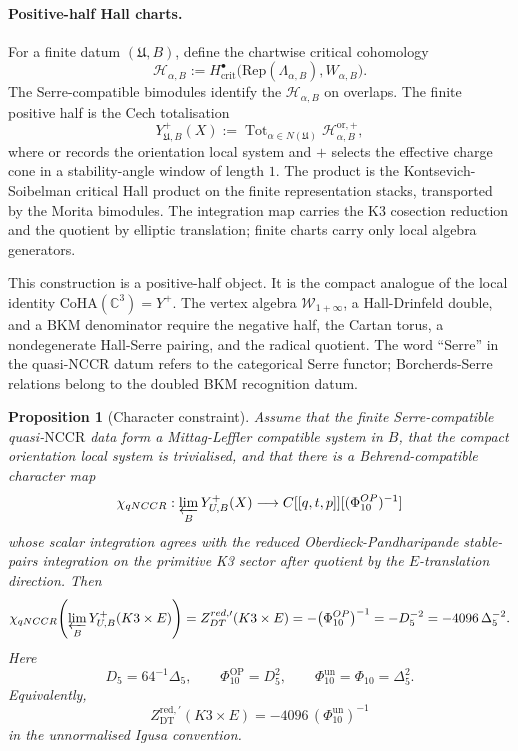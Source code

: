 \documentclass[11pt]{article}
\providecommand{\bC}{\mathbb{C}}
\providecommand{\CoHA}{\mathrm{CoHA}}
\providecommand{\DT}{\mathrm{DT}}
\providecommand{\Rep}{\mathrm{Rep}}
\providecommand{\Tot}{\operatorname{Tot}}
\providecommand{\red}{\mathrm{red}}
\providecommand{\bcrit}{\mathrm{crit}}
\providecommand{\NCCR}{\mathrm{NCCR}}
\providecommand{\Yplus}{Y^{+}}
\providecommand{\DeltaFive}{\Delta_{5}}
\providecommand{\Dfive}{D_{5}}
\providecommand{\PhiTen}{\Phi_{10}}
\providecommand{\PhiTenOP}{\Phi_{10}^{\mathrm{OP}}}
\providecommand{\PhiTenUn}{\Phi_{10}^{\mathrm{un}}}
\theoremstyle{plain}
\newtheorem{proposition}[theorem]{Proposition}
\theoremstyle{definition}
\begin{document}
\paragraph*{Positive-half Hall charts.}
For a finite datum \((\mathfrak U,B)\), define the chartwise critical
cohomology
\[
  \mathcal H_{\alpha,B}:=
  H^\bullet_{\bcrit}\bigl(\Rep(\Lambda_{\alpha,B}),W_{\alpha,B}\bigr).
\]
The Serre-compatible bimodules identify the \(\mathcal H_{\alpha,B}\)
on overlaps. The finite positive half is the Cech totalisation
\[
  \Yplus_{\mathfrak U,B}(X):=
  \Tot_{\alpha\in N(\mathfrak U)}
  \mathcal H_{\alpha,B}^{\mathrm{or},+},
\]
where \(\mathrm{or}\) records the orientation local system and \(+\)
selects the effective charge cone in a stability-angle window of
length \(1\).
The product is the Kontsevich-Soibelman critical Hall product on the
finite representation stacks, transported by the Morita bimodules.
The integration map carries the K3 cosection reduction and the quotient
by elliptic translation; finite charts carry only local algebra
generators.

This construction is a positive-half object. It is the compact analogue
of the local identity \(\CoHA(\bC^3)=Y^+\). The vertex algebra
\(\mathcal W_{1+\infty}\), a Hall-Drinfeld double, and a BKM
denominator require the negative half, the Cartan torus, a
nondegenerate Hall-Serre pairing, and the radical quotient. The word
``Serre'' in the quasi-\(\NCCR\) datum refers to the categorical Serre
functor; Borcherds-Serre relations belong to the doubled BKM
recognition datum.

\begin{proposition}[Character constraint]
\label{prop:qnccr-character-constraint}
Assume that the finite Serre-compatible quasi-\(\NCCR\) data form a
Mittag-Leffler compatible system in \(B\), that the compact orientation
local system is trivialised, and that there is a Behrend-compatible
character map
\[
  \chi_{\mathrm{qNCCR}}\colon
  \varprojlim_B\Yplus_{\mathfrak U,B}(X)
  \longrightarrow
  \bC[[q,t,p]][(\PhiTenOP)^{-1}]
\]
whose scalar integration agrees with the reduced
Oberdieck-Pandharipande stable-pairs integration on the primitive K3
sector after quotient by the \(E\)-translation direction. Then
\[
  \chi_{\mathrm{qNCCR}}\!\left(
  \varprojlim_B\Yplus_{\mathfrak U,B}(K3\times E)\right)
  =
  Z^{\red,\prime}_{\DT}(K3\times E)
  =
  -\bigl(\PhiTenOP\bigr)^{-1}
  =
  -\Dfive^{-2}
  =
  -4096\,\DeltaFive^{-2}.
\]
Here
\[
  \Dfive=64^{-1}\DeltaFive,
  \qquad
  \PhiTenOP=\Dfive^2,
  \qquad
  \PhiTenUn=\PhiTen=\DeltaFive^2.
\]
Equivalently,
\[
  Z^{\red,\prime}_{\DT}(K3\times E)
  =
  -4096\,(\PhiTenUn)^{-1}
\]
in the unnormalised Igusa convention.
\end{proposition}
\end{document}
